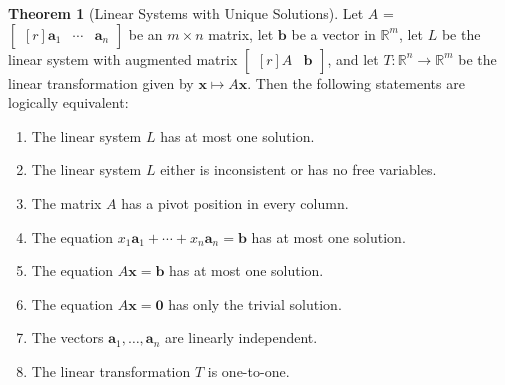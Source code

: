 \documentclass{myart}
\renewcommand{\vec}[1]{\ensuremath{\mathbf{#1}}} %
\newcommand{\mat}[1]{\ensuremath{#1}} %
\newcommand{\R}[1][]{\ensuremath{\mathbb{R}^{#1}}} %
\newcommand{\by}{\ensuremath{\times}} %
\newcommand{\MAT}[2][r]{\ensuremath{\begin{bmatrix*}[#1]#2\end{bmatrix*}}} %
\newcommand{\many}[2][n]{\ensuremath{{#2}_1, \ldots, {#2}_{#1}}} %
\theoremstyle{definition}
\newtheorem{thm}{Theorem}
\begin{document}
\begin{thm}[Linear Systems with Unique Solutions]
Let \mat A = \MAT{\vec a_1 & \cdots & \vec a_n} be an $m \by n$ matrix, let \vec b be a vector in \R[m], let $L$ be the linear system with augmented matrix \MAT{\mat A & \vec b}, and let $T : \R[n] \to \R[m]$ be the linear transformation given by $\vec x \mapsto \mat A\vec x$. Then the following statements are logically equivalent:
\begin{enumerate}
\item The linear system $L$ has at most one solution.
\item The linear system $L$ either is inconsistent or has no free variables.
\item The matrix \mat A has a pivot position in every column.
\item The equation $x_1\vec a_1 + \cdots + x_n\vec a_n = \vec b$ has at most one solution.
\item The equation $\mat A\vec x = \vec b$ has at most one solution.
\item The equation $\mat A\vec x = \vec 0$ has only the trivial solution.
\item The vectors \many{\vec a} are linearly independent.
\item The linear transformation $T$ is one-to-one.
\end{enumerate}
\end{thm}
\end{document}
